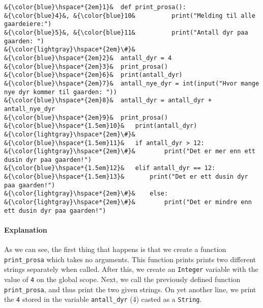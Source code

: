 \documentclass{assignment}
\date{1. September 2019}
\begin{document}

	\begin{lstlisting}[style=custompython]
&{\color{blue}\hspace*{2em}1}&	def print_prosa():
&{\color{blue}4}&, &{\color{blue}10&		  print("Melding til alle gaardeiere:")
&{\color{blue}5}&, &{\color{blue}11&		  print("Antall dyr paa gaarden: ")
&{\color{lightgray}\hspace*{2em}\#}&
&{\color{blue}\hspace*{2em}2}&	antall_dyr = 4
&{\color{blue}\hspace*{2em}3}&	print_prosa()
&{\color{blue}\hspace*{2em}6}&	print(antall_dyr)
&{\color{blue}\hspace*{2em}7}&	antall_nye_dyr = int(input("Hvor mange nye dyr kommer til gaarden: "))
&{\color{blue}\hspace*{2em}8}&	antall_dyr = antall_dyr + antall_nye_dyr
&{\color{blue}\hspace*{2em}9}&	print_prosa()
&{\color{blue}\hspace*{1.5em}10}&	print(antall_dyr)
&{\color{lightgray}\hspace*{2em}\#}&
&{\color{blue}\hspace*{1.5em}11}&	if antall_dyr > 12:
&{\color{lightgray}\hspace*{2em}\#}&		print("Det er mer enn ett dusin dyr paa gaarden!")
&{\color{blue}\hspace*{1.5em}12}&	elif antall_dyr == 12:
&{\color{blue}\hspace*{1.5em}13}&	 	print("Det er ett dusin dyr paa gaarden!")
&{\color{lightgray}\hspace*{2em}\#}&	else:
&{\color{lightgray}\hspace*{2em}\#}&		print("Det er mindre enn ett dusin dyr paa gaarden!")
	\end{lstlisting}
\paragraph{Explanation}As we can see, the first thing that happens is that we create a function \texttt{print\_prosa} which takes no arguments. This function prints prints two different strings separately when called. After this, we create an \texttt{Integer} variable with the value of \texttt{4} on the global scope. Next, we call the previously defined function \texttt{print\_prosa}, and thus print the two given strings. On yet another line, we print the \texttt{4} stored in the variable \texttt{antall\_dyr} (4) casted as a \texttt{String}.
\end{document}

